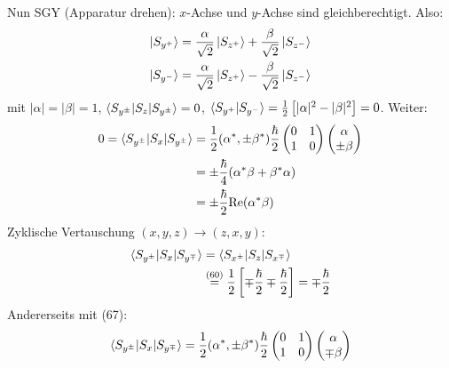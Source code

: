 \documentclass[a4paper]{scrartcl}
\newenvironment{aaufz}
	{\renewcommand{\labelenumi}{\alph{enumi})}
   \renewcommand{\labelenumii}{\alph{enumii})}
   \begin{enumerate}}
  {\end{enumerate}}
\renewcommand{\Re}{\ensuremath \mathrm{Re}}
\begin{document}
{\begin{aaufz}
Nun SGY (Apparatur drehen): $x$-Achse und $y$-Achse sind gleichberechtigt. Also:
\begin{align}
\begin{split}
\ket{S_{y	^+}} & = \frac \alpha {\sqrt2} \ket{ S_{z^+}} + \frac \beta {\sqrt2} \ket{ S_{z^-}} \\
\ket{S_{y^-}} & = \frac \alpha {\sqrt2} \ket{ S_{z^+}} - \frac \beta {\sqrt2} \ket{ S_{z^-}}
\end{split}
\end{align}
mit $\vert \alpha \vert = \vert \beta \vert = 1$, $\braket{ S_{y^\pm} | S_z | S_{y^\pm}} = 0$, $\braket{ S_{y^+} | S_{y^-}} = \frac12 \left[ \vert \alpha \vert^2 - \vert \beta \vert^2 \right] = 0$. Weiter:
\begin{align}
\begin{split}
0=\braket{   S_{y^\pm} | S_x | S_{y^\pm}} & =
\frac12 (\alpha^*, \pm \beta^*) \frac \hbar 2 \begin{pmatrix} 0 & 1 \\ 1 & 0 \end{pmatrix} \begin{pmatrix} \alpha \\ \pm \beta \end{pmatrix} \\
& = \pm \frac \hbar 4 (\alpha^* \beta + \beta^* \alpha) \\
& = \pm \frac \hbar 2 \Re (\alpha^* \beta)
\end{split}
\end{align}
Zyklische Vertauschung $(x,y,z) \rightarrow (z,x,y)$:
\begin{align}
\begin{split}
\braket{ S_{y^\pm} | S_x | S_{y^\mp}} & = \braket{ S_{x^\pm} | S_z | S_{x^\mp}} \\
& \stackrel{(60)}= \frac12 \left[ \mp \frac \hbar 2 \mp \frac \hbar 2 \right] = \mp \frac \hbar 2
\end{split}
\end{align}
Andererseits mit (67):
\begin{align}
\begin{split}
\braket{ S_{y^\pm} | S_x | S_{y^\mp}} & = \frac12 (\alpha^*, \pm \beta^*) \frac \hbar 2 \begin{pmatrix} 0 & 1 \\ 1 & 0 \end{pmatrix} \begin{pmatrix} \alpha \\ \mp \beta \end{pmatrix} \\

\end{split}
\end{align}
\end{aaufz}}
\end{document}
